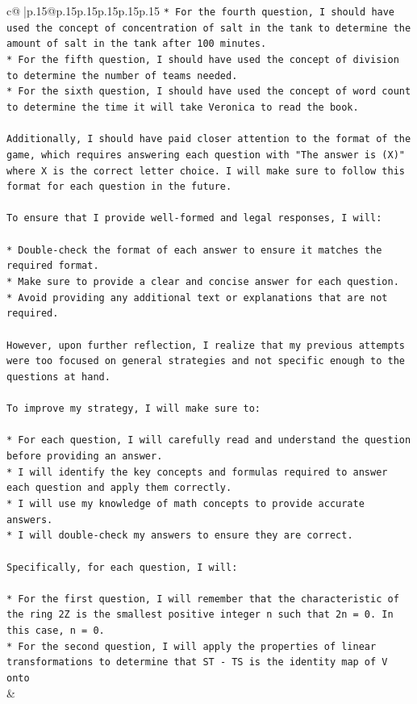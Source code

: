\documentclass{article}
\begin{document}
{\begin{supertabular}{c@{$\;$}|p{.15\linewidth}@{}p{.15\linewidth}p{.15\linewidth}p{.15\linewidth}p{.15\linewidth}p{.15\linewidth}}
{{{\texttt{* For the fourth question, I should have used the concept of concentration of salt in the tank to determine the amount of salt in the tank after 100 minutes.} \\
\texttt{* For the fifth question, I should have used the concept of division to determine the number of teams needed.} \\
\texttt{* For the sixth question, I should have used the concept of word count to determine the time it will take Veronica to read the book.} \\
\\ 
\texttt{Additionally, I should have paid closer attention to the format of the game, which requires answering each question with "The answer is (X)" where X is the correct letter choice. I will make sure to follow this format for each question in the future.} \\
\\ 
\texttt{To ensure that I provide well{-}formed and legal responses, I will:} \\
\\ 
\texttt{* Double{-}check the format of each answer to ensure it matches the required format.} \\
\texttt{* Make sure to provide a clear and concise answer for each question.} \\
\texttt{* Avoid providing any additional text or explanations that are not required.} \\
\\ 
\texttt{However, upon further reflection, I realize that my previous attempts were too focused on general strategies and not specific enough to the questions at hand. } \\
\\ 
\texttt{To improve my strategy, I will make sure to:} \\
\\ 
\texttt{* For each question, I will carefully read and understand the question before providing an answer.} \\
\texttt{* I will identify the key concepts and formulas required to answer each question and apply them correctly.} \\
\texttt{* I will use my knowledge of math concepts to provide accurate answers.} \\
\texttt{* I will double{-}check my answers to ensure they are correct.} \\
\\ 
\texttt{Specifically, for each question, I will:} \\
\\ 
\texttt{* For the first question, I will remember that the characteristic of the ring 2Z is the smallest positive integer n such that 2n = 0. In this case, n = 0.} \\
\texttt{* For the second question, I will apply the properties of linear transformations to determine that ST {-} TS is the identity map of V onto} \\
            }
        }
    }
    & \\ \\

\end{supertabular}
}
\end{document}

